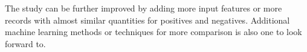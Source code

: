 \documentclass[journal]{./IEEE/IEEEtran}
\begin{document}
The study can be further improved by adding more input features or more records with almost similar quantities for positives and negatives. Additional  machine learning methods or techniques for more comparison is also one to look forward to.







\nocite{*}


\end{document}
